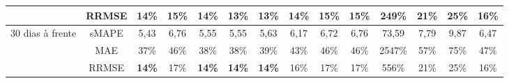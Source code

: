 \begin{landscape}
\begin{table}[H]
\begin{tabular}{@{}cccccccccccccc@{}}
		& RRMSE    & \textbf{14\%} & 15\%          & \textbf{14\%} & \textbf{13\%} & \textbf{13\%} & \textbf{14\%} & 15\%          & 15\%          & 249\%         & 21\% & 25\% & 16\% \\ \midrule
		\multirow{3}{*}{30 dias à frente} & sMAPE    & 5,43          & 6,76          & 5,55          & 5,55          & 5,63          & 6,17          & 6,72          & 6,76          & 73,59         & 7,79 & 9,87 & 6,47 \\
		& MAE      & 37\%          & 46\%          & 38\%          & 38\%          & 39\%          & 43\%          & 46\%          & 46\%          & 2547\%        & 57\% & 75\% & 47\% \\
		& RRMSE    & \textbf{14\%} & 17\%          & \textbf{14\%} & \textbf{14\%} & \textbf{14\%} & 16\%          & 17\%          & 17\%          & 556\%         & 21\% & 25\% & 16\% \\ \cmidrule(l){1-14} 
	\end{tabular}
	
\end{table}

\newpage


\end{landscape}
